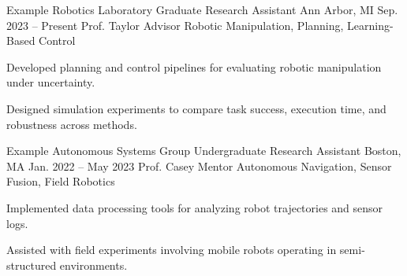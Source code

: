 
\VectraResearchExperienceEntry
    {Example Robotics Laboratory}
    {Graduate Research Assistant}
    {Ann Arbor, MI}
    {Sep. 2023 -- Present}
    {Prof. Taylor Advisor}
    {Robotic Manipulation, Planning, Learning-Based Control}
    {
        \item Developed planning and control pipelines for evaluating robotic manipulation under uncertainty.
        \item Designed simulation experiments to compare task success, execution time, and robustness across methods.
    }

\VectraResearchExperienceEntry
    {Example Autonomous Systems Group}
    {Undergraduate Research Assistant}
    {Boston, MA}
    {Jan. 2022 -- May 2023}
    {Prof. Casey Mentor}
    {Autonomous Navigation, Sensor Fusion, Field Robotics}
    {
        \item Implemented data processing tools for analyzing robot trajectories and sensor logs.
        \item Assisted with field experiments involving mobile robots operating in semi-structured environments.
    }